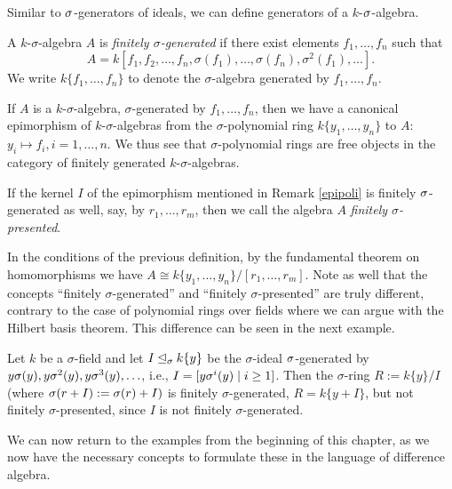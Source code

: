 Similar to $\sigma$-generators of ideals, we can define generators of a $k$-$\sigma$-algebra.

\begin{defn}
A $k$-$\sigma$-algebra  $A$ is \emph{finitely $\sigma$-generated} if there exist elements $f_1, \ldots, f_n$ such that $$A = k[f_1,f_2,\ldots,f_n,\sigma(f_1),\ldots,\sigma(f_n),\sigma^2(f_1),\ldots].$$
We write  $k\{f_1, \ldots, f_n\}$ to denote the  $\sigma$-algebra generated by $f_1, \ldots, f_n$.
\end{defn}

\begin{rem}\label{epipoli}
If $A$ is a $k$-$\sigma$-algebra, $\sigma$-generated by $f_1, \ldots, f_n$, then we have a canonical epimorphism of $k$-$\sigma$-algebras from the $\sigma$-polynomial ring $k\{y_1, \ldots, y_n \}$ to $A$: $y_i \mapsto f_i, i = 1, \ldots, n$. We thus see that $\sigma$-polynomial rings are free objects in the category of finitely generated $k$-$\sigma$-algebras. 
\end{rem}

\begin{defn}
If the kernel $I$ of the epimorphism mentioned in Remark \ref{epipoli} is finitely $\sigma$-generated as well, say, by $r_1, \ldots, r_m$, then we call the algebra $A$ \emph{finitely $\sigma$-presented}. 
\end{defn}

\begin{rem}
In the conditions of the previous definition, by the fundamental theorem on homomorphisms we have $A \cong k\{y_1, \ldots, y_n\}/[r_1,\ldots,r_m]$. Note as well that the concepts ``finitely $\sigma$-generated'' and ``finitely $\sigma$-presented'' are truly different, contrary to the case of polynomial rings over fields where we can argue with the Hilbert basis theorem. This difference can be seen in the next example.
\end{rem}

\begin{ex}
Let $k$ be a $\sigma$-field and let $I \unlhd_{\sigma} k\{y\} $ be the $\sigma$-ideal $\sigma$-generated by $y\sigma(y), y\sigma^2(y), y\sigma^3(y), \ldots$, i.e., $I = [y \sigma^i(y) \mid i\geq 1]$. Then the $\sigma$-ring $R := k\{y\}/I$ (where $\sigma (r + I) := \sigma(r) + I)$ is 
finitely $\sigma$-generated, $R = k\{ y + I \}$, but not finitely $\sigma$-presented, since $I$ is not finitely $\sigma$-generated.
\end{ex}


We can now return to the examples from the beginning of this chapter, as we now have the necessary concepts to formulate these in the language of difference algebra. 

